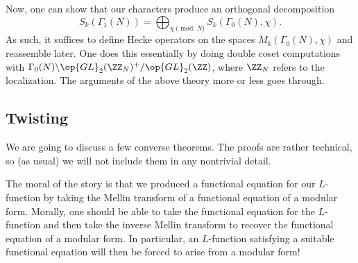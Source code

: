 \documentclass{article}
\begin{document}
Now, one can show that our characters produce an orthogonal decomposition
\[S_k(\Gamma_1(N))=\bigoplus_{\chi\pmod N}S_k(\Gamma_0(N),\chi).\]
As such, it suffices to define Hecke operators on the spaces $M_k(\Gamma_0(N),\chi)$ and reassemble later. One does this essentially by doing double coset computations with $\Gamma_0(N)\backslash\op{GL}_2(\ZZ_N)^+/\op{GL}_2(\ZZ)$, where $\ZZ_N$ refers to the localization. The arguments of the above theory more or less goes through.

\subsection{Twisting}
We are going to discuss a few converse theorems. The proofs are rather technical, so (as usual) we will not include them in any nontrivial detail.

The moral of the story is that we produced a functional equation for our $L$-function by taking the Mellin transform of a functional equation of a modular form. Morally, one should be able to take the functional equation for the $L$-function and then take the inverse Mellin transform to recover the functional equation of a modular form. In particular, an $L$-function satisfying a suitable functional equation will then be forced to arise from a modular form!
\end{document}
